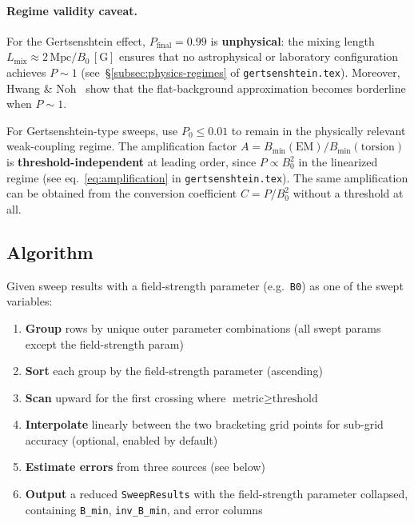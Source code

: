 \paragraph{Regime validity caveat.}
For the Gertsenshtein effect, $P_\text{final} = 0.99$ is \textbf{unphysical}: the
mixing length $L_\text{mix} \approx 2\,\text{Mpc}/B_0\,[\text{G}]$ ensures that no
astrophysical or laboratory configuration achieves $P \sim 1$
(see~\S\ref{subsec:physics-regimes} of \texttt{gertsenshtein.tex}).
Moreover, Hwang \& Noh~\cite{hwangnoh2023graviton} show that the flat-background
approximation becomes borderline when $P \sim 1$.

For Gertsenshtein-type sweeps, use $P_0 \leq 0.01$ to remain in the physically
relevant weak-coupling regime.  The amplification factor
$A = B_\text{min}(\text{EM})/B_\text{min}(\text{torsion})$ is
\textbf{threshold-independent} at leading order, since $P \propto B_0^2$ in the
linearized regime (see eq.~\eqref{eq:amplification} in \texttt{gertsenshtein.tex}).
The same amplification can be obtained from the conversion coefficient
$C = P/B_0^2$ without a threshold at all.

\subsection{Algorithm}
\label{sec:cf-algorithm}

Given sweep results with a field-strength parameter (e.g.\ \texttt{B0}) as one of the
swept variables:

\begin{enumerate}
  \item \textbf{Group} rows by unique outer parameter combinations (all swept params
    except the field-strength param)
  \item \textbf{Sort} each group by the field-strength parameter (ascending)
  \item \textbf{Scan} upward for the first crossing where $\text{metric} \geq \text{threshold}$
  \item \textbf{Interpolate} linearly between the two bracketing grid points for
    sub-grid accuracy (optional, enabled by default)
  \item \textbf{Estimate errors} from three sources (see below)
  \item \textbf{Output} a reduced \texttt{SweepResults} with the field-strength parameter
    collapsed, containing \texttt{B\_min}, \texttt{inv\_B\_min}, and error columns
\end{enumerate}

